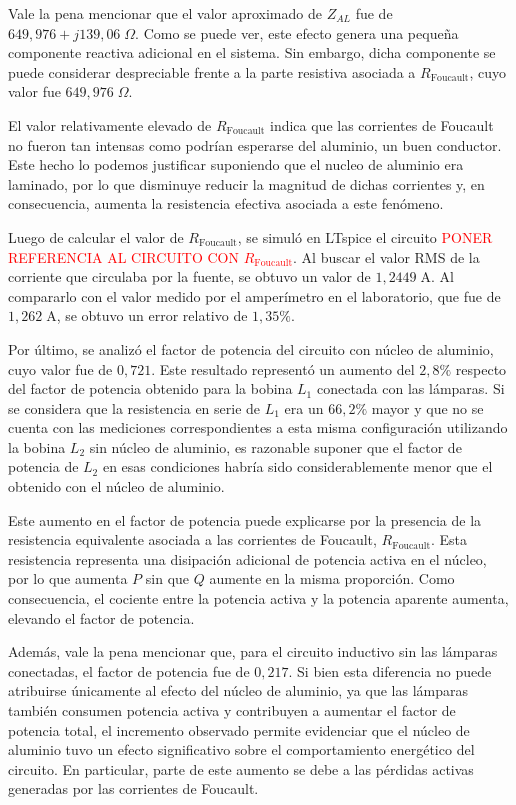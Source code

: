 Vale la pena mencionar que el valor aproximado de \(Z_{AL}\) fue de $649{,}976+j139{,}06 \; \Omega$. Como se puede ver, este efecto genera una pequeña componente reactiva adicional en el sistema. Sin embargo, dicha componente se puede considerar despreciable frente a la parte resistiva asociada a \(R_{\text{Foucault}}\), cuyo valor fue $649{,}976 \; \Omega$.

El valor relativamente elevado de \(R_{\text{Foucault}}\) indica que las corrientes de Foucault no fueron tan intensas como podrían esperarse del aluminio, un buen conductor. Este hecho lo podemos justificar suponiendo que el nucleo de aluminio era laminado, por lo que disminuye reducir la magnitud de dichas corrientes y, en consecuencia, aumenta la resistencia efectiva asociada a este fenómeno.


Luego de calcular el valor de \(R_{\text{Foucault}}\), se simuló en LTspice el circuito \textcolor{red}{\MakeUppercase{Poner referencia al circuito con \(R_{\text{Foucault}}\)}}. Al buscar el valor RMS de la corriente que circulaba por la fuente, se obtuvo un valor de \(1{,}2449 \; \mathrm{A}\). Al compararlo con el valor medido por el amperímetro en el laboratorio, que fue de \(1{,}262 \; \mathrm{A}\), se obtuvo un error relativo de \(1{,}35\%\).

Por último, se analizó el factor de potencia del circuito con núcleo de aluminio, cuyo valor fue de \(0{,}721\). Este resultado representó un aumento del \(2{,}8\%\) respecto del factor de potencia obtenido para la bobina \(L_1\) conectada con las lámparas. Si se considera que la resistencia en serie de \(L_1\) era un \(66{,}2\%\) mayor y que no se cuenta con las mediciones correspondientes a esta misma configuración utilizando la bobina \(L_2\) sin núcleo de aluminio, es razonable suponer que el factor de potencia de \(L_2\) en esas condiciones habría sido considerablemente menor que el obtenido con el núcleo de aluminio.

Este aumento en el factor de potencia puede explicarse por la presencia de la resistencia equivalente asociada a las corrientes de Foucault, \(R_{\text{Foucault}}\). Esta resistencia representa una disipación adicional de potencia activa en el núcleo, por lo que aumenta \(P\) sin que \(Q\) aumente en la misma proporción. Como consecuencia, el cociente entre la potencia activa y la potencia aparente aumenta, elevando el factor de potencia.

Además, vale la pena mencionar que, para el circuito inductivo sin las lámparas conectadas, el factor de potencia fue de \(0{,}217\). Si bien esta diferencia no puede atribuirse únicamente al efecto del núcleo de aluminio, ya que las lámparas también consumen potencia activa y contribuyen a aumentar el factor de potencia total, el incremento observado permite evidenciar que el núcleo de aluminio tuvo un efecto significativo sobre el comportamiento energético del circuito. En particular, parte de este aumento se debe a las pérdidas activas generadas por las corrientes de Foucault.

\newpage